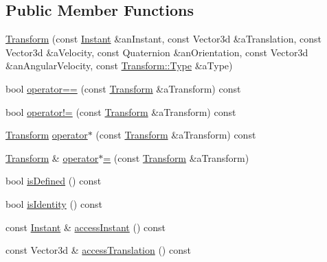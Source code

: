 \subsection*{Public Member Functions}
\begin{DoxyCompactItemize}
\item 
\hyperlink{classostk_1_1physics_1_1coord_1_1_transform_a2117020ea022e73d64f7e4ac0c88ac46}{Transform} (const \hyperlink{classostk_1_1physics_1_1time_1_1_instant}{Instant} \&an\+Instant, const Vector3d \&a\+Translation, const Vector3d \&a\+Velocity, const Quaternion \&an\+Orientation, const Vector3d \&an\+Angular\+Velocity, const \hyperlink{classostk_1_1physics_1_1coord_1_1_transform_a4325aff71186125b3ca8604247f55215}{Transform\+::\+Type} \&a\+Type)
\item 
bool \hyperlink{classostk_1_1physics_1_1coord_1_1_transform_a0b1b8aa57021abeef185f69c4f0981ce}{operator==} (const \hyperlink{classostk_1_1physics_1_1coord_1_1_transform}{Transform} \&a\+Transform) const
\item 
bool \hyperlink{classostk_1_1physics_1_1coord_1_1_transform_a2dc5d65fdd5c364df815e5fa8b1f4b74}{operator!=} (const \hyperlink{classostk_1_1physics_1_1coord_1_1_transform}{Transform} \&a\+Transform) const
\item 
\hyperlink{classostk_1_1physics_1_1coord_1_1_transform}{Transform} \hyperlink{classostk_1_1physics_1_1coord_1_1_transform_ad596e25498b79fd0a5ae9a338c9a44e8}{operator$\ast$} (const \hyperlink{classostk_1_1physics_1_1coord_1_1_transform}{Transform} \&a\+Transform) const
\item 
\hyperlink{classostk_1_1physics_1_1coord_1_1_transform}{Transform} \& \hyperlink{classostk_1_1physics_1_1coord_1_1_transform_a63884c293c7f92e1a2fc0a33889dedc9}{operator$\ast$=} (const \hyperlink{classostk_1_1physics_1_1coord_1_1_transform}{Transform} \&a\+Transform)
\item 
bool \hyperlink{classostk_1_1physics_1_1coord_1_1_transform_a7bfe06d33b9aa8b62cc976b871bcc6ae}{is\+Defined} () const
\item 
bool \hyperlink{classostk_1_1physics_1_1coord_1_1_transform_a1519ff40a90b8ebc488cf926b7f9535b}{is\+Identity} () const
\item 
const \hyperlink{classostk_1_1physics_1_1time_1_1_instant}{Instant} \& \hyperlink{classostk_1_1physics_1_1coord_1_1_transform_a3b7d5279c94c3ff0cd324fc929eae533}{access\+Instant} () const
\item 
const Vector3d \& \hyperlink{classostk_1_1physics_1_1coord_1_1_transform_a5b5deef8d1a152934ce22334da35dffe}{access\+Translation} () const

\end{DoxyCompactItemize}

